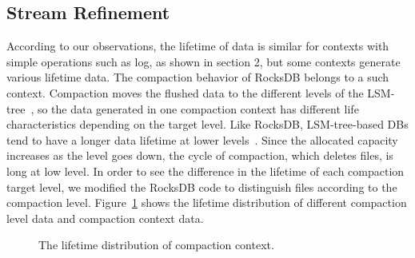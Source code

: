 \subsection{Stream Refinement}
According to our observations, the lifetime of data is similar 
for contexts with simple operations such as log, as shown in section 2, 
but some contexts generate various lifetime data.
The compaction behavior of RocksDB belongs to a such context.
Compaction moves the flushed data to the different levels
of the LSM-tree~\cite{RocksDB}, 
so the data generated in one compaction context has 
different life characteristics depending on the target level.
Like RocksDB, LSM-tree-based DBs tend to have a longer 
data lifetime at lower levels~\cite{Level}.
Since the allocated capacity increases as the level goes down, 
the cycle of compaction, which deletes files, is long at low level.
In order to see the difference in the lifetime of each compaction target level,
we modified the RocksDB code to distinguish files according to the compaction level.
Figure~\ref{fig:compaction} shows the lifetime distribution of 
different compaction level data and compaction context data.

\begin{figure}[!t]
\centering
\hspace{1pt}
\hfill
\vspace{-10pt}
\vspace{-10pt}
\caption{The lifetime distribution of compaction context.} 
\label{fig:compaction}
\vspace{-25pt}
\end{figure}

